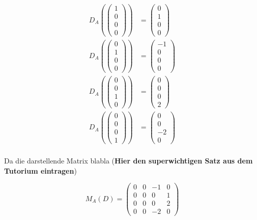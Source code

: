 \documentclass[a4paper,german,12pt,smallheadings]{scrartcl}
\begin{document}
\begin{align*}
  D_A\left(\begin{pmatrix} 1 \\ 0 \\ 0 \\ 0\end{pmatrix}\right) &= \begin{pmatrix} 0 \\ 1 \\ 0 \\ 0\end{pmatrix} \\
  D_A\left(\begin{pmatrix} 0 \\ 1 \\ 0 \\ 0\end{pmatrix}\right) &= \begin{pmatrix} -1 \\ 0 \\ 0 \\ 0\end{pmatrix} \\
  D_A\left(\begin{pmatrix} 0 \\ 0 \\ 1 \\ 0\end{pmatrix}\right) &= \begin{pmatrix} 0 \\ 0 \\ 0 \\ 2\end{pmatrix} \\
  D_A\left(\begin{pmatrix} 0 \\ 0 \\ 0 \\ 1\end{pmatrix}\right) &= \begin{pmatrix} 0 \\ 0 \\ -2 \\ 0\end{pmatrix} \\
\end{align*}

Da die darstellende Matrix blabla (\textbf{Hier den superwichtigen Satz aus dem Tutorium eintragen})

\begin{equation}
  M_A(D) = \begin{pmatrix}0 & 0 & -1 & 0 \\ 0 & 0 & 0 & 1 \\ 0 & 0 & 0 & 2 \\ 0 & 0 & -2 & 0\end{pmatrix}
\end{equation}
\end{document}
